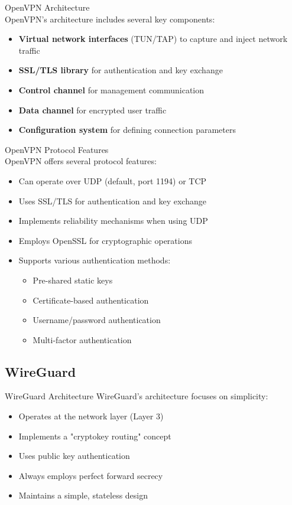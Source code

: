 \begin{concept}{OpenVPN Architecture}\\
OpenVPN's architecture includes several key components:
\begin{itemize}
    \item \textbf{Virtual network interfaces} (TUN/TAP) to capture and inject network traffic
    \item \textbf{SSL/TLS library} for authentication and key exchange
    \item \textbf{Control channel} for management communication
    \item \textbf{Data channel} for encrypted user traffic
    \item \textbf{Configuration system} for defining connection parameters
\end{itemize}
\end{concept}

\begin{theorem}{OpenVPN Protocol Features}\\
OpenVPN offers several protocol features:
\begin{itemize}
    \item Can operate over UDP (default, port 1194) or TCP
    \item Uses SSL/TLS for authentication and key exchange
    \item Implements reliability mechanisms when using UDP
    \item Employs OpenSSL for cryptographic operations
    \item Supports various authentication methods:
    \begin{itemize}
        \item Pre-shared static keys
        \item Certificate-based authentication
        \item Username/password authentication
        \item Multi-factor authentication
    \end{itemize}
\end{itemize}
\end{theorem}

\subsection{WireGuard}

\begin{concept}{WireGuard Architecture}
WireGuard's architecture focuses on simplicity:
\begin{itemize}
    \item Operates at the network layer (Layer 3)
    \item Implements a "cryptokey routing" concept
    \item Uses public key authentication
    \item Always employs perfect forward secrecy
    \item Maintains a simple, stateless design
\end{itemize}
\end{concept}

